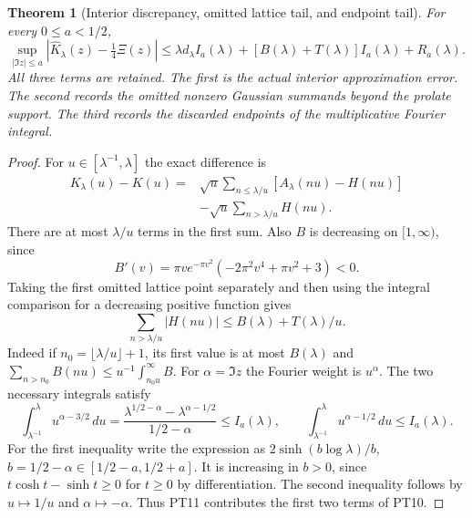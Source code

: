 \documentclass[11pt]{article}
\newtheorem{theorem}{Theorem}[section]
\begin{document}
\begin{theorem}[Interior discrepancy, omitted lattice tail, and endpoint tail]
For every $0\leq a<1/2$,
\begin{equation}\tag{PT10}
 \sup_{|\Im z|\leq a}
 \left|\widehat K_\lambda(z)-\tfrac14\Xi(z)\right|
 \leq \lambda d_\lambda I_a(\lambda)
       +[B(\lambda)+T(\lambda)]I_a(\lambda)+R_a(\lambda).
\end{equation}
All three terms are retained. The first is the actual interior
approximation error. The second records the omitted nonzero
Gaussian summands beyond the prolate support. The third records
the discarded endpoints of the multiplicative Fourier integral.
\end{theorem}
\begin{proof}
For $u\in[\lambda^{-1},\lambda]$ the exact difference is
\begin{equation}\tag{PT11}
 \begin{split}
 K_\lambda(u)-K(u)
   ={}&\sqrt u\sum_{n\leq\lambda/u}
                       [A_\lambda(nu)-H(nu)]\\
     &-\sqrt u\sum_{n>\lambda/u}H(nu).
 \end{split}
\end{equation}
There are at most $\lambda/u$ terms in the first sum.
Also $B$ is decreasing on $[1,\infty)$, since
\[
 B'(v)=\pi v e^{-\pi v^2}(-2\pi^2v^4+\pi v^2+3)<0.
\]
Taking the first omitted lattice point separately and then
using the integral comparison for a decreasing positive function gives
\begin{equation}\tag{PT12}
 \sum_{n>\lambda/u}|H(nu)|\leq B(\lambda)+T(\lambda)/u.
\end{equation}
Indeed if $n_0=\lfloor\lambda/u\rfloor+1$, its first value is
at most $B(\lambda)$ and
$\sum_{n>n_0}B(nu)\leq u^{-1}\int_{n_0u}^\infty B$.
For $\alpha=\Im z$ the Fourier weight is $u^\alpha$.
The two necessary integrals satisfy
\[
 \int_{\lambda^{-1}}^\lambda u^{\alpha-3/2}\,du
 =\frac{\lambda^{1/2-\alpha}-\lambda^{\alpha-1/2}}{1/2-\alpha}
 \leq I_a(\lambda),
 \qquad
 \int_{\lambda^{-1}}^\lambda u^{\alpha-1/2}\,du
 \leq I_a(\lambda).
\]
For the first inequality write the expression as
$2\sinh(b\log\lambda)/b$, $b=1/2-\alpha\in[1/2-a,1/2+a]$.
It is increasing in $b>0$, since
$t\cosh t-\sinh t\geq0$ for $t\geq0$ by differentiation.
The second inequality follows by $u\mapsto1/u$ and
$\alpha\mapsto-\alpha$. Thus PT11 contributes the first two
terms of PT10.


\end{proof}
\end{document}
